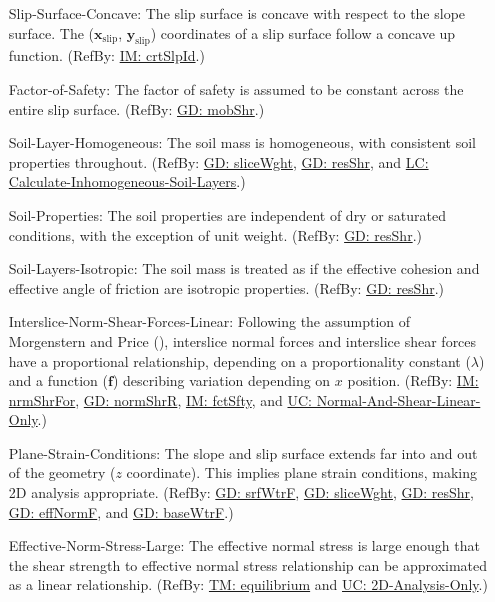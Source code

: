 \documentclass[12pt]{article}
\begin{document}
\begin{itemize}
\item[Slip-Surface-Concave:\phantomsection\label{assumpSSC}]{The slip surface is concave with respect to the slope surface. The (${\mathbf{x}_{\text{slip}}}$, ${\mathbf{y}_{\text{slip}}}$) coordinates of a slip surface follow a concave up function. (RefBy: \hyperref[IM:crtSlpId]{IM: crtSlpId}.)}
\item[Factor-of-Safety:\phantomsection\label{assumpFOS}]{The factor of safety is assumed to be constant across the entire slip surface. (RefBy: \hyperref[GD:mobShr]{GD: mobShr}.)}
\item[Soil-Layer-Homogeneous:\phantomsection\label{assumpSLH}]{The soil mass is homogeneous, with consistent soil properties throughout. (RefBy: \hyperref[GD:sliceWght]{GD: sliceWght}, \hyperref[GD:resShr]{GD: resShr}, and \hyperref[LC_inhomogeneous]{LC: Calculate-Inhomogeneous-Soil-Layers}.)}
\item[Soil-Properties:\phantomsection\label{assumpSP}]{The soil properties are independent of dry or saturated conditions, with the exception of unit weight. (RefBy: \hyperref[GD:resShr]{GD: resShr}.)}
\item[Soil-Layers-Isotropic:\phantomsection\label{assumpSLI}]{The soil mass is treated as if the effective cohesion and effective angle of friction are isotropic properties. (RefBy: \hyperref[GD:resShr]{GD: resShr}.)}
\item[Interslice-Norm-Shear-Forces-Linear:\phantomsection\label{assumpINSFL}]{Following the assumption of Morgenstern and Price (\cite{morgenstern1965}), interslice normal forces and interslice shear forces have a proportional relationship, depending on a proportionality constant ($λ$) and a function ($\mathbf{f}$) describing variation depending on $x$ position. (RefBy: \hyperref[IM:nrmShrFor]{IM: nrmShrFor}, \hyperref[GD:normShrR]{GD: normShrR}, \hyperref[IM:fctSfty]{IM: fctSfty}, and \hyperref[UC_normshearlinear]{UC: Normal-And-Shear-Linear-Only}.)}
\item[Plane-Strain-Conditions:\phantomsection\label{assumpPSC}]{The slope and slip surface extends far into and out of the geometry ($z$ coordinate). This implies plane strain conditions, making 2D analysis appropriate. (RefBy: \hyperref[GD:srfWtrF]{GD: srfWtrF}, \hyperref[GD:sliceWght]{GD: sliceWght}, \hyperref[GD:resShr]{GD: resShr}, \hyperref[GD:effNormF]{GD: effNormF}, and \hyperref[GD:baseWtrF]{GD: baseWtrF}.)}
\item[Effective-Norm-Stress-Large:\phantomsection\label{assumpENSL}]{The effective normal stress is large enough that the shear strength to effective normal stress relationship can be approximated as a linear relationship. (RefBy: \hyperref[TM:equilibrium]{TM: equilibrium} and \hyperref[UC_2donly]{UC: 2D-Analysis-Only}.)}

\end{itemize}
\end{document}

